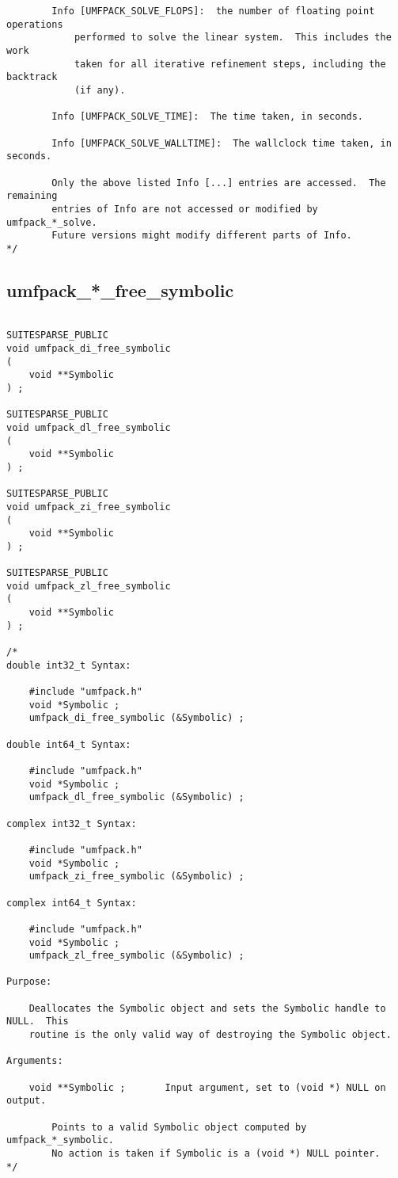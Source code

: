 \documentclass[11pt]{article}
\begin{document}
{\begin{verbatim}
        Info [UMFPACK_SOLVE_FLOPS]:  the number of floating point operations
            performed to solve the linear system.  This includes the work
            taken for all iterative refinement steps, including the backtrack
            (if any).

        Info [UMFPACK_SOLVE_TIME]:  The time taken, in seconds.

        Info [UMFPACK_SOLVE_WALLTIME]:  The wallclock time taken, in seconds.

        Only the above listed Info [...] entries are accessed.  The remaining
        entries of Info are not accessed or modified by umfpack_*_solve.
        Future versions might modify different parts of Info.
*/
\end{verbatim}
}

\newpage
\subsection{umfpack\_*\_free\_symbolic}

{\footnotesize
\begin{verbatim}

SUITESPARSE_PUBLIC
void umfpack_di_free_symbolic
(
    void **Symbolic
) ;

SUITESPARSE_PUBLIC
void umfpack_dl_free_symbolic
(
    void **Symbolic
) ;

SUITESPARSE_PUBLIC
void umfpack_zi_free_symbolic
(
    void **Symbolic
) ;

SUITESPARSE_PUBLIC
void umfpack_zl_free_symbolic
(
    void **Symbolic
) ;

/*
double int32_t Syntax:

    #include "umfpack.h"
    void *Symbolic ;
    umfpack_di_free_symbolic (&Symbolic) ;

double int64_t Syntax:

    #include "umfpack.h"
    void *Symbolic ;
    umfpack_dl_free_symbolic (&Symbolic) ;

complex int32_t Syntax:

    #include "umfpack.h"
    void *Symbolic ;
    umfpack_zi_free_symbolic (&Symbolic) ;

complex int64_t Syntax:

    #include "umfpack.h"
    void *Symbolic ;
    umfpack_zl_free_symbolic (&Symbolic) ;

Purpose:

    Deallocates the Symbolic object and sets the Symbolic handle to NULL.  This
    routine is the only valid way of destroying the Symbolic object.

Arguments:

    void **Symbolic ;       Input argument, set to (void *) NULL on output.

        Points to a valid Symbolic object computed by umfpack_*_symbolic.
        No action is taken if Symbolic is a (void *) NULL pointer.
*/
\end{verbatim}
}
\end{document}
